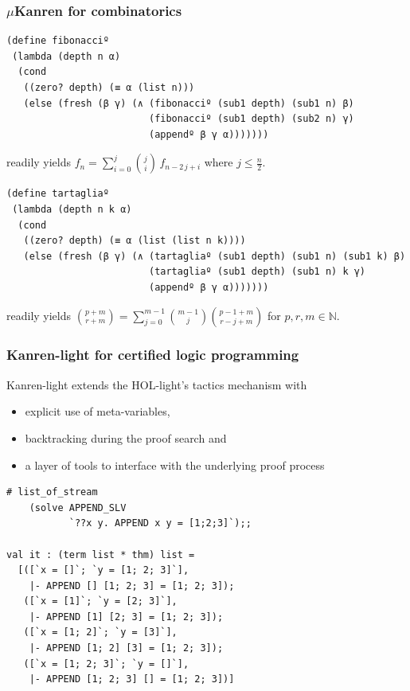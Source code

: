\documentclass[9pt]{beamer}
\begin{document}
\begin{frame}[fragile]
\frametitle{$\mu$Kanren for combinatorics}
\vfill
\begin{verbatim}
(define fibonacciº
 (lambda (depth n α)
  (cond
   ((zero? depth) (≡ α (list n)))
   (else (fresh (β γ) (∧ (fibonacciº (sub1 depth) (sub1 n) β)
                         (fibonacciº (sub1 depth) (sub2 n) γ)
                         (appendº β γ α)))))))
\end{verbatim}
readily yields $\displaystyle f_{n} = \sum_{i=0}^{j}{{
{j}\choose{i} }\,f_{n-2\,j+i}}$ where
$\displaystyle j\leq \frac{n}{2}$.
\vfill
\begin{verbatim}
(define tartagliaº
 (lambda (depth n k α)
  (cond
   ((zero? depth) (≡ α (list (list n k))))
   (else (fresh (β γ) (∧ (tartagliaº (sub1 depth) (sub1 n) (sub1 k) β)
                         (tartagliaº (sub1 depth) (sub1 n) k γ)
                         (appendº β γ α)))))))
\end{verbatim}
readily yields $\displaystyle { {p+m}\choose{r+m} } = \sum_{j=0}^{m-1}{{
{m-1}\choose{j} }{ {p-1+m}\choose{r-j+m} }}$ for $p,r,m\in\mathbb{N}$.

\end{frame}

\begin{frame}[fragile]
\frametitle{Kanren-light for certified logic programming}
Kanren-light extends the HOL-light's tactics mechanism with 
\begin{itemize}
\item explicit use of meta-variables, 
\item backtracking during the proof search and
\item a layer of tools to interface with the underlying proof process
\end{itemize}

\begin{verbatim}
# list_of_stream
    (solve APPEND_SLV
           `??x y. APPEND x y = [1;2;3]`);;

val it : (term list * thm) list =
  [([`x = []`; `y = [1; 2; 3]`],
    |- APPEND [] [1; 2; 3] = [1; 2; 3]);
   ([`x = [1]`; `y = [2; 3]`],
    |- APPEND [1] [2; 3] = [1; 2; 3]);
   ([`x = [1; 2]`; `y = [3]`],
    |- APPEND [1; 2] [3] = [1; 2; 3]);
   ([`x = [1; 2; 3]`; `y = []`],
    |- APPEND [1; 2; 3] [] = [1; 2; 3])]
\end{verbatim}
\end{frame}
\end{document}
